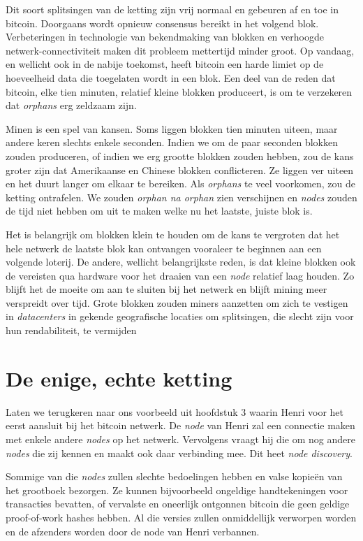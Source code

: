 Dit soort splitsingen van de ketting zijn vrij normaal en gebeuren af en toe in bitcoin. Doorgaans wordt opnieuw consensus bereikt in het volgend blok. Verbeteringen in technologie van bekendmaking van blokken en verhoogde netwerk-connectiviteit maken dit probleem mettertijd minder groot. Op vandaag, en wellicht ook in de nabije toekomst, heeft bitcoin een harde limiet op de hoeveelheid data die toegelaten wordt in een blok. Een deel van de reden dat bitcoin, elke tien minuten, relatief kleine blokken produceert, is om te verzekeren dat \textit{orphans} erg zeldzaam zijn.

Minen is een spel van kansen. Soms liggen blokken tien minuten uiteen, maar andere keren slechts enkele seconden. Indien we om de paar seconden blokken zouden produceren, of indien we erg grootte blokken zouden hebben, zou de kans groter zijn dat Amerikaanse en Chinese blokken conflicteren. Ze liggen ver uiteen en het duurt langer om elkaar te bereiken. Als \textit{orphans} te veel voorkomen, zou de ketting ontrafelen. We zouden \textit{orphan na orphan} zien verschijnen en \textit{nodes} zouden de tijd niet hebben om uit te maken welke nu het laatste, juiste blok is.

Het is belangrijk om blokken klein te houden om de kans te vergroten dat het hele netwerk de laatste blok kan ontvangen vooraleer te beginnen aan een volgende loterij. De andere, wellicht belangrijkste reden, is dat kleine blokken ook de vereisten qua hardware voor het draaien van een \textit{node} relatief laag houden. Zo blijft het de moeite om aan te sluiten bij het netwerk en blijft mining meer verspreidt over tijd. Grote blokken zouden miners aanzetten om zich te vestigen in \textit{datacenters} in gekende geografische locaties om splitsingen, die slecht zijn voor hun rendabiliteit, te vermijden

\section{De enige, echte ketting}
Laten we terugkeren naar ons voorbeeld uit hoofdstuk 3 waarin Henri voor het eerst aansluit bij het bitcoin netwerk. De \textit{node} van Henri zal een connectie maken met enkele andere \textit{nodes} op het netwerk. Vervolgens vraagt hij die om nog andere \textit{nodes} die zij kennen en maakt ook daar verbinding mee. Dit heet \textit{node discovery}.

Sommige van die \textit{nodes} zullen slechte bedoelingen hebben en valse kopieën van het grootboek bezorgen. Ze kunnen bijvoorbeeld ongeldige handtekeningen voor transacties bevatten, of vervalste en oneerlijk ontgonnen bitcoin die geen geldige proof-of-work hashes hebben. Al die versies zullen onmiddellijk verworpen worden en de afzenders worden door de node van Henri verbannen.

